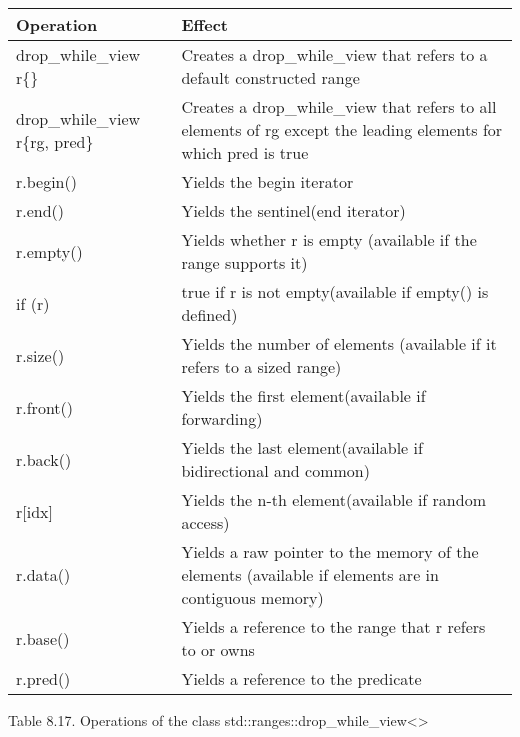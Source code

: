 \begin{longtable}[c]{|l|l|}
\hline
\textbf{Operation} & \textbf{Effect}                                                         \\ \hline
\endfirsthead
%
\endhead
%
drop\_while\_view r\{\}         & Creates a drop\_while\_view that refers to a default constructed range                                           \\ \hline
drop\_while\_view r\{rg, pred\} & Creates a drop\_while\_view that refers to all elements of rg except the leading elements for which pred is true \\ \hline
r.begin()          & Yields the begin iterator                                               \\ \hline
r.end()            & Yields the sentinel(end iterator)                                       \\ \hline
r.empty()          & Yields whether r is empty (available if the range supports it)          \\ \hline
if (r)             & true if r is not empty(available if empty() is defined)                 \\ \hline
r.size()           & Yields the number of elements (available if it refers to a sized range) \\ \hline
r.front()          & Yields the first element(available if forwarding)                       \\ \hline
r.back()           & Yields the last element(available if bidirectional and common)          \\ \hline
r{[}idx{]}         & Yields the n-th element(available if random access)                     \\ \hline
r.data()                        & Yields a raw pointer to the memory of the elements (available if elements are in contiguous memory)              \\ \hline
r.base()           & Yields a reference to the range that r refers to or owns                \\ \hline
r.pred()           & Yields a reference to the predicate                                     \\ \hline
\end{longtable}

\begin{center}
Table 8.17. Operations of the class std::ranges::drop\_while\_view<>
\end{center}

